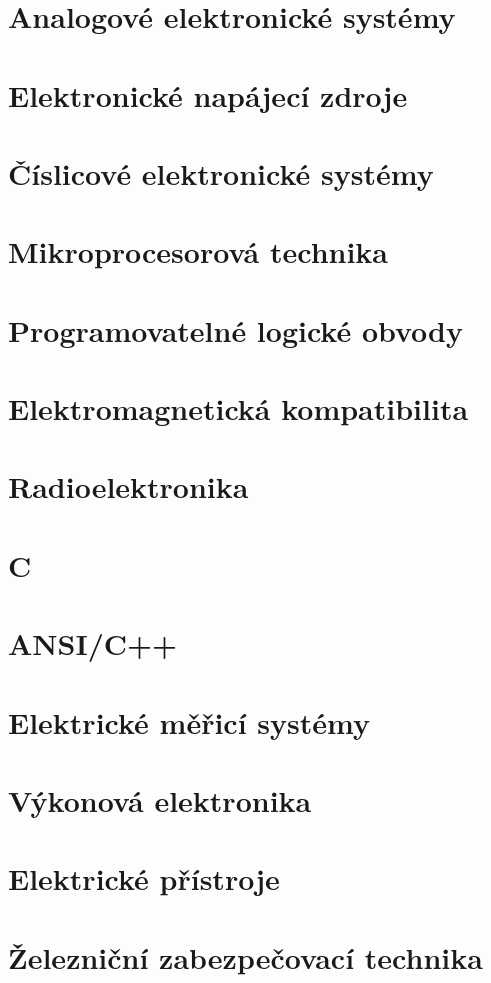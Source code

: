 \documentclass[fontsize=10pt,pagesize]{scrbook}
\begin{document}
{  \part{Analogové elektronické systémy}
    
  \part{Elektronické napájecí zdroje}
    
  \part{Číslicové elektronické systémy}
    
  \part{Mikroprocesorová technika}
    
  \part{Programovatelné logické obvody}
    
  \part{Elektromagnetická kompatibilita}
    
  \part{Radioelektronika}
    
  \part{C}
    
  \part{ANSI/C++}
    
  \part{Elektrické měřicí systémy}
    
  \part{Výkonová elektronika}
    
  \part{Elektrické přístroje}
    
  \part{Železniční zabezpečovací technika}
    
}    
\backmatter %

  \printbibliography[title={Bibliografie}]
\end{document}
